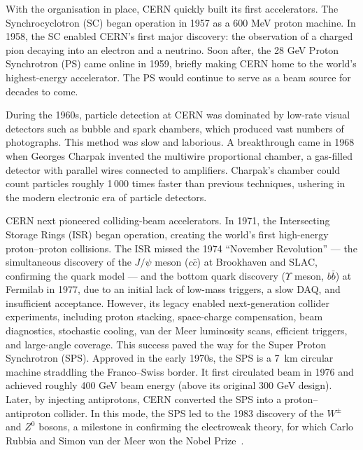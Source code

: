 \vspace{0.5 cm}

With the organisation in place, CERN quickly built its first accelerators. The Synchrocyclotron (SC) began operation in 1957 as a 600 MeV proton machine. In 1958, the SC enabled CERN's first major discovery: the observation of a charged pion decaying into an electron and a neutrino. Soon after, the 28 GeV Proton Synchrotron (PS) came online in 1959, briefly making CERN home to the world's highest-energy accelerator. The PS would continue to serve as a beam source for decades to come.

During the 1960s, particle detection at CERN was dominated by low-rate visual detectors such as bubble and spark chambers, which produced vast numbers of photographs. This method was slow and laborious. A breakthrough came in 1968 when Georges Charpak invented the multiwire proportional chamber, a gas-filled detector with parallel wires connected to amplifiers. Charpak's chamber could count particles roughly 1\,000 times faster than previous techniques, ushering in the modern electronic era of particle detectors.

\vspace{0.5 cm}

CERN next pioneered colliding-beam accelerators. In 1971, the Intersecting Storage Rings (ISR) began operation, creating the world's first high-energy proton--proton collisions. The ISR missed the 1974 ``November Revolution'' --- the simultaneous discovery of the $J/\psi$ meson ($c\bar{c}$) at Brookhaven and SLAC, confirming the quark model --- and the bottom quark discovery ($\Upsilon$ meson, $b\bar{b}$) at Fermilab in 1977, due to an initial lack of low-mass triggers, a slow DAQ, and insufficient acceptance. However, its legacy enabled next-generation collider experiments, including proton stacking, space-charge compensation, beam diagnostics, stochastic cooling, van der Meer luminosity scans, efficient triggers, and large-angle coverage. This success paved the way for the Super Proton Synchrotron (SPS). Approved in the early 1970s, the SPS is a 7~km circular machine straddling the Franco–Swiss border. It first circulated beam in 1976 and achieved roughly 400 GeV beam energy (above its original 300 GeV design). Later, by injecting antiprotons, CERN converted the SPS into a proton–antiproton collider. In this mode, the SPS led to the 1983 discovery of the $W^\pm$ and $Z^0$ bosons, a milestone in confirming the electroweak theory, for which Carlo Rubbia and Simon van der Meer won the Nobel Prize~\cite{WandZ}.

